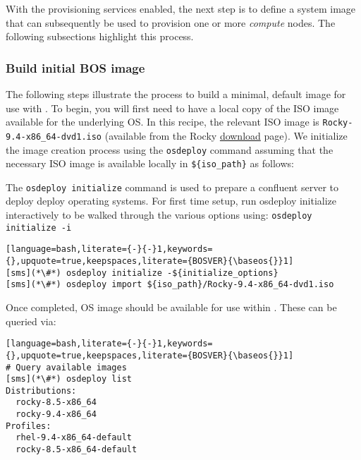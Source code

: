 
With the provisioning services enabled, the next step is to define
a system image that can subsequently be
used to provision one or more {\em compute} nodes. The following subsections highlight this process.

\subsubsection{Build initial BOS image} \label{sec:assemble_bos}
The following steps illustrate the process to build a minimal, default image for use with \Confluent{}. To begin, you will
first need to have a local copy of the ISO image available for the underlying OS. In this recipe, the relevant ISO image
is \texttt{Rocky-9.4-x86\_64-dvd1.iso} (available from the Rocky
\href{https://rockylinux.org/download/}{\color{blue}download} page).
We initialize the image
creation process using the \texttt{osdeploy} command assuming that the necessary ISO image is available locally in
\texttt{\$\{iso\_path\}} as follows:

The \texttt{osdeploy initialize} command is used to prepare a confluent server to deploy deploy operating systems.
For first time setup, run osdeploy initialize interactively to be walked through the various options using: 
\texttt{osdeploy initialize -i}

\begin{lstlisting}[language=bash,literate={-}{-}1,keywords={},upquote=true,keepspaces,literate={BOSVER}{\baseos{}}1]
[sms](*\#*) osdeploy initialize -${initialize_options}
[sms](*\#*) osdeploy import ${iso_path}/Rocky-9.4-x86_64-dvd1.iso

\end{lstlisting}

\noindent Once completed, OS image should be available for use within \Confluent{}. These can be queried via:

\begin{lstlisting}[language=bash,literate={-}{-}1,keywords={},upquote=true,keepspaces,literate={BOSVER}{\baseos{}}1]
# Query available images
[sms](*\#*) osdeploy list
Distributions:
  rocky-8.5-x86_64
  rocky-9.4-x86_64
Profiles:
  rhel-9.4-x86_64-default
  rocky-8.5-x86_64-default
\end{lstlisting}


